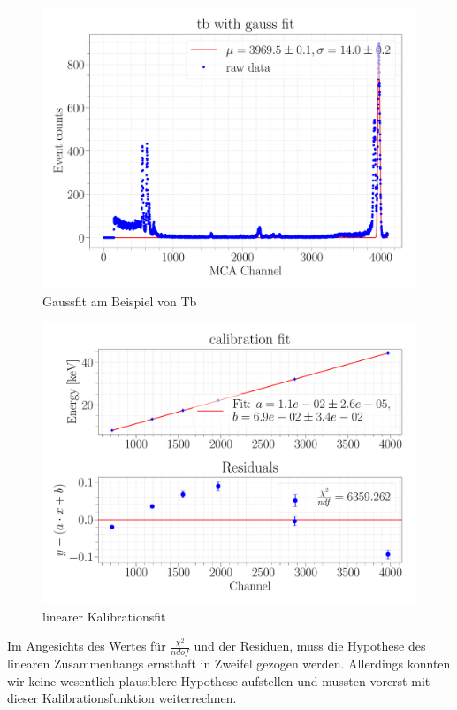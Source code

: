 \documentclass[a4paper,14pt]{article}
\begin{document}
\begin{figure}[H]
\centering
\includegraphics[width=\textwidth]{../Figures/am_tb_gauss.pdf}
\caption{Gaussfit am Beispiel von Tb}
\label{am_tb_gauss}
\end{figure}

\begin{figure}[H]
\centering
\includegraphics[scale=0.25]{../Figures/am_calibration_fit.pdf}
\caption{linearer Kalibrationsfit}
\label{am_calibration_fit}
\end{figure}

Im Angesichts des Wertes für $\frac{\chi^2}{ndof}$ und der Residuen, muss die Hypothese des linearen Zusammenhangs ernsthaft in Zweifel gezogen werden. Allerdings konnten wir keine wesentlich plausiblere Hypothese aufstellen und mussten vorerst mit dieser Kalibrationsfunktion weiterrechnen.
\end{document}
